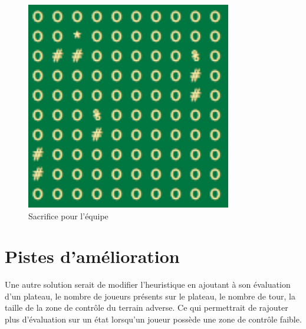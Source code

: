 \begin{figure}[H]
	\centering
	\includegraphics[width=0.8\textwidth, keepaspectratio, height=0.2\textheight]{./pics/sacrifice.png}	
	\caption{Sacrifice pour l'équipe}
\end{figure}


\section{Pistes d'amélioration}
Une autre solution serait de modifier l'heuristique en ajoutant à son 
évaluation d'un plateau, le nombre de joueurs présents sur le plateau, le
nombre de tour, la taille de la zone de contrôle du terrain adverse. Ce qui
permettrait de rajouter plus d'évaluation sur un état lorsqu'un joueur
possède une zone de contrôle faible.

